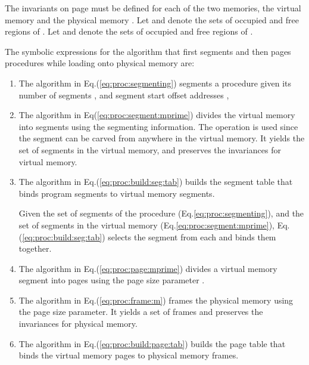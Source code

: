 \documentclass[draft]{article}
\begin{document}
The  invariants  on  page \pageref{eq:total:size:invariance}  must  be
defined for  each of the  two memories, the virtual  memory 
and   the    physical   memory   .     Let      and
  denote the  sets  of occupied  and  free regions  of
.  Let   and  denote the  sets of occupied
and free regions of .

The  symbolic expressions for  the algorithm  that first  segments and
then pages procedures while loading onto physical memory are:

\begin{enumerate}
\item   The    algorithm   in  Eq.(\ref{eq:proc:segmenting})
  segments  a procedure   given  its  number of  segments ,  and
  segment start offset addresses ,  
  
\item  The    algorithm in  Eq(\ref{eq:proc:segment:mprime})
  divides  the  virtual  memory   into  segments  using  the
  segmenting information.   The  operation is  used since the
  segment  can be  carved from  anywhere  in the  virtual memory.   It
  yields  the set   of  segments in  the virtual  memory, and
  preserves the invariances for virtual memory.
  
\item  The     algorithm  in  Eq.(\ref{eq:proc:build:seg:tab})
  builds  the segment  table that  binds program  segments  to virtual
  memory segments.
  
  Given    the    set   of    segments    of    the   procedure    
  (Eq.\ref{eq:proc:segmenting}),  and  the  set  of  segments  in  the
  virtual           memory          (Eq.\ref{eq:proc:segment:mprime}),
  Eq.(\ref{eq:proc:build:seg:tab})  selects the   segment from
  each and binds them together.

\item  The     algorithm  in  Eq.(\ref{eq:proc:page:mprime})
  divides  a virtual  memory segment  into pages  using the  page size
  parameter .

  
\item The   algorithm in  Eq.(\ref{eq:proc:frame:m}) frames
  the physical memory  using  the page size parameter.  It yields a
  set   of frames and  preserves the invariances  for physical
  memory.
  

\item  The    algorithm in  Eq.(\ref{eq:proc:build:page:tab})
  builds  the  page table  that  binds  the  virtual memory  pages  to
  physical memory  frames.
  
\end{enumerate}
\end{document}
